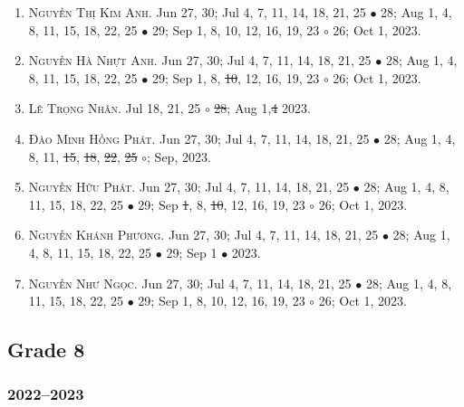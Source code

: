 \documentclass{article}
\begin{document}
\begin{enumerate}
	\item \textsc{Nguyễn Thị Kim Anh.} {\sf[In]} Jun 27, 30; Jul 4, 7, 11, 14, 18, 21, 25 $\bullet$ 28; Aug 1, 4, 8, 11, 15, 18, 22, 25 $\bullet$ 29; Sep 1, 8, 10, 12, 16, 19, 23 $\circ$ 26; Oct 1, 2023.
	\item \textsc{Nguyễn Hà Nhựt Anh.} {\sf[In]} Jun 27, 30; Jul 4, 7, 11, 14, 18, 21, 25 $\bullet$ 28; Aug 1, 4, 8, 11, 15, 18, 22, 25 $\bullet$ 29; Sep 1, 8, \st{10}, 12, 16, 19, 23 $\circ$ 26; Oct 1, 2023.
	\item \textsc{Lê Trọng Nhân.} {\sf[In]} Jul 18, 21, 25 $\circ$ \st{28}; Aug 1,\st{4} 2023. \sf{[Out]}
	\item \textsc{Đào Minh Hồng Phát.} {\sf[In]} Jun 27, 30; Jul 4, 7, 11, 14, 18, 21, 25 $\bullet$ 28; Aug 1, 4, 8, 11, \st{15}, \st{18}, \st{22}, \st{25} $\circ$; Sep, 2023. \sf{[Out]}
	\item \textsc{Nguyễn Hữu Phát.} {\sf[In]} Jun 27, 30; Jul 4, 7, 11, 14, 18, 21, 25 $\bullet$ 28; Aug 1, 4, 8, 11, 15, 18, 22, 25 $\bullet$ 29; Sep \st{1}, 8, \st{10}, 12, 16, 19, 23 $\circ$ 26; Oct 1, 2023.
	\item \textsc{Nguyễn Khánh Phương.} {\sf[In]} Jun 27, 30; Jul 4, 7, 11, 14, 18, 21, 25 $\bullet$ 28; Aug 1, 4, 8, 11, 15, 18, 22, 25 $\bullet$ 29; Sep 1 $\bullet$ 2023. \sf{[Out]}
	\item \textsc{Nguyễn Như Ngọc.} {\sf[In]} Jun 27, 30; Jul 4, 7, 11, 14, 18, 21, 25 $\bullet$ 28; Aug 1, 4, 8, 11, 15, 18, 22, 25 $\bullet$ 29; Sep 1, 8, 10, 12, 16, 19, 23 $\circ$ 26; Oct 1, 2023.
\end{enumerate}

\subsection{Grade 8}

\subsubsection{2022--2023}
\end{document}
